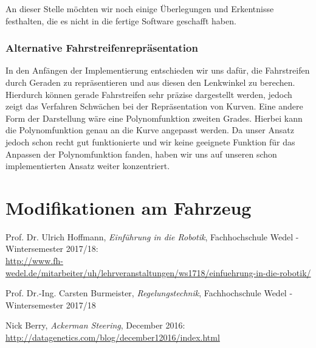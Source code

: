 \documentclass[a4paper,12pt]{report}
\begin{document}
	An dieser Stelle möchten wir noch einige Überlegungen und Erkentnisse festhalten,
	die es nicht in die fertige Software geschafft haben.
	
\subsection{Alternative Fahrstreifenrepräsentation}

	In den Anfängen der Implementierung entschieden wir uns dafür, die Fahrstreifen durch Geraden zu repräsentieren und aus diesen den Lenkwinkel zu berechen. Hierdurch können gerade Fahrstreifen sehr präzise dargestellt werden, jedoch zeigt das Verfahren Schwächen bei der Repräsentation von Kurven. Eine andere Form der Darstellung wäre eine Polynomfunktion zweiten Grades. Hierbei kann die Polynomfunktion genau an die Kurve angepasst werden. Da unser Ansatz jedoch schon recht gut funktionierte und wir keine geeignete Funktion für das Anpassen der Polynomfunktion fanden, haben wir uns auf unseren schon implementierten Ansatz weiter konzentriert.

\chapter{Modifikationen am Fahrzeug}



\begin{thebibliography}{9}
	
	Prof. Dr. Ulrich Hoffmann,
	\textit{Einführung in die Robotik},
	Fachhochschule Wedel - Wintersemester 2017/18:\\
	\url{http://www.fh-wedel.de/mitarbeiter/uh/lehrveranstaltungen/ws1718/einfuehrung-in-die-robotik/}
	
	Prof. Dr.-Ing. Carsten Burmeister,
	\textit{Regelungstechnik},
	Fachhochschule Wedel - Wintersemester 2017/18
	
	Nick Berry,
	\textit{Ackerman Steering},
	December 2016:\\
	\url{http://datagenetics.com/blog/december12016/index.html}
	
	
	
\end{thebibliography}
\end{document}
